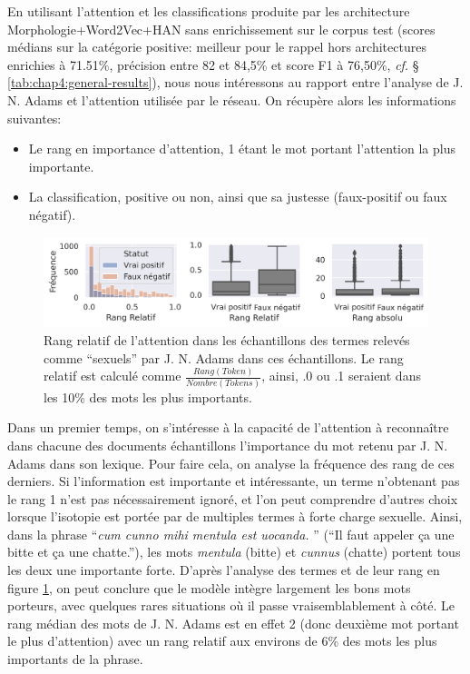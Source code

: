 En utilisant l'attention et les classifications produite par les architecture Morphologie+Word2Vec+HAN sans enrichissement sur le corpus test (scores médians sur la catégorie positive: meilleur pour le rappel hors architectures enrichies à 71.51\%, précision entre 82 et 84,5\% et score F1 à 76,50\%, \textit{cf.} § \ref{tab:chap4:general-results}), nous nous intéressons au rapport entre l'analyse de J. N. Adams et l'attention utilisée par le réseau. On récupère alors les informations suivantes:
\begin{itemize}
    \item Le rang en importance d'attention, 1 étant le mot portant l'attention la plus importante.
    \item La classification, positive ou non, ainsi que sa justesse (faux-positif ou faux négatif).
\end{itemize}

\begin{figure}
    \centering
    \includegraphics[width=\linewidth]{figures/chap4/ranksStatus.png}
    \caption{Rang relatif de l'attention dans les échantillons des termes relevés comme ``sexuels'' par J. N. Adams dans ces échantillons. Le rang relatif est calculé comme $\frac{Rang(Token)}{Nombre(Tokens)}$, ainsi, .0 ou .1 seraient dans les 10\% des mots les plus importants.}
    \label{fig:chap4:ranks-attention}
\end{figure}

Dans un premier temps, on s'intéresse à la capacité de l'attention à reconnaître dans chacune des documents échantillons l'importance du mot retenu par J. N. Adams dans son lexique. Pour faire cela, on analyse la fréquence des rang de ces derniers. Si l'information est importante et intéressante, un terme n'obtenant pas le rang 1 n'est pas nécessairement ignoré, et l'on peut comprendre d'autres choix lorsque l'isotopie est portée par de multiples termes à forte charge sexuelle. Ainsi, dans la phrase ``\textit{cum cunno mihi mentula est uocanda. }'' (``Il faut appeler ça une bitte et ça une chatte.''), les mots \textit{mentula} (bitte) et \textit{cunnus} (chatte) portent tous les deux une importante forte. D'après l'analyse des termes et de leur rang en figure \ref{fig:chap4:ranks-attention}, on peut conclure que le modèle intègre largement les bons mots porteurs, avec quelques rares situations où il passe vraisemblablement à côté. Le rang médian des mots de J. N. Adams est en effet 2 (donc deuxième mot portant le plus d'attention) avec un rang relatif aux environs de 6\% des mots les plus importants de la phrase.

